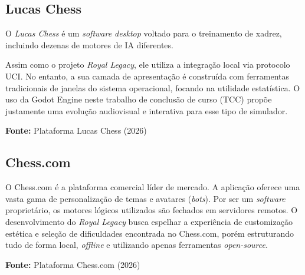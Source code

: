 \subsection{Lucas Chess}

O \textit{Lucas Chess} é um \textit{software desktop} voltado para o treinamento de xadrez, incluindo dezenas de motores de IA diferentes.

Assim como o projeto \textit{Royal Legacy}, ele utiliza a integração local via protocolo UCI. No entanto, a sua camada de apresentação é construída com ferramentas tradicionais de janelas do sistema operacional, focando na utilidade estatística. O uso da Godot Engine neste trabalho de conclusão de curso (TCC) propõe justamente uma evolução audiovisual e interativa para esse tipo de simulador.

\nopagebreak
\begin{center}
	\vspace{-0.2cm} %
	\small \textbf{Fonte:} Plataforma Lucas Chess (2026)
\end{center}

\subsection{Chess.com}

O Chess.com é a plataforma comercial líder de mercado. A aplicação oferece uma vasta gama de personalização de temas e avatares (\textit{bots}). Por ser um \textit{software} proprietário, os motores lógicos utilizados são fechados em servidores remotos. O desenvolvimento do \textit{Royal Legacy} busca espelhar a experiência de customização estética e seleção de dificuldades encontrada no Chess.com, porém estruturando tudo de forma local, \textit{offline} e utilizando apenas ferramentas \textit{open-source}.

\begin{center}
	\vspace{-0.2cm} %
	\small \textbf{Fonte:} Plataforma Chess.com (2026)
\end{center}